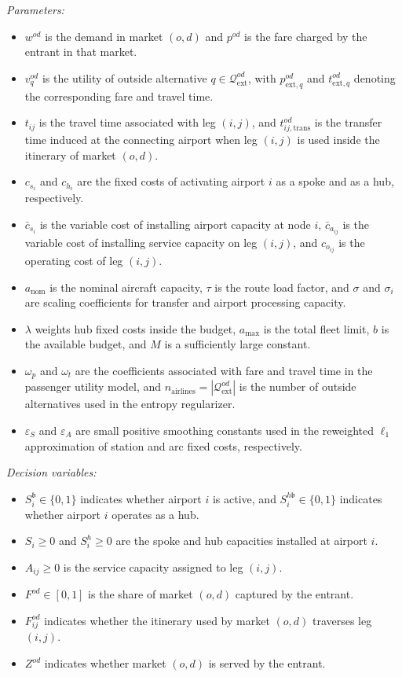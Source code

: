 \bigskip
\noindent \textit{Parameters:}
\begin{itemize}
\item $w^{od}$ is the demand in market $(o,d)$ and $p^{od}$ is the fare charged by the entrant in that market.
\item $v_q^{od}$ is the utility of outside alternative $q\in\mathcal{Q}_{\mathrm{ext}}^{od}$, with $p^{od}_{\mathrm{ext},q}$ and $t^{od}_{\mathrm{ext},q}$ denoting the corresponding fare and travel time.
\item $t_{ij}$ is the travel time associated with leg $(i,j)$, and $t^{od}_{ij,\mathrm{trans}}$ is the transfer time induced at the connecting airport when leg $(i,j)$ is used inside the itinerary of market $(o,d)$.
\item $c_{s_i}$ and $c_{h_i}$ are the fixed costs of activating airport $i$ as a spoke and as a hub, respectively.
\item $\bar c_{s_i}$ is the variable cost of installing airport capacity at node $i$, $\bar c_{a_{ij}}$ is the variable cost of installing service capacity on leg $(i,j)$, and $c_{o_{ij}}$ is the operating cost of leg $(i,j)$.
\item $a_{\mathrm{nom}}$ is the nominal aircraft capacity, $\tau$ is the route load factor, and $\sigma$ and $\sigma_i$ are scaling coefficients for transfer and airport processing capacity.
\item $\lambda$ weights hub fixed costs inside the budget, $a_{\max}$ is the total fleet limit, $b$ is the available budget, and $M$ is a sufficiently large constant.
\item $\omega_p$ and $\omega_t$ are the coefficients associated with fare and travel time in the passenger utility model, and $n_{\mathrm{airlines}}=|\mathcal{Q}_{\mathrm{ext}}^{od}|$ is the number of outside alternatives used in the entropy regularizer.
\item $\varepsilon_S$ and $\varepsilon_A$ are small positive smoothing constants used in the reweighted $\ell_1$ approximation of station and arc fixed costs, respectively.
\end{itemize}

\bigskip
\noindent \textit{Decision variables:}
\begin{itemize}
\item $S_i^{\mathfrak b}\in\{0,1\}$ indicates whether airport $i$ is active, and $S_i^{h\mathfrak b}\in\{0,1\}$ indicates whether airport $i$ operates as a hub.
\item $S_i\ge 0$ and $S_i^h\ge 0$ are the spoke and hub capacities installed at airport $i$.
\item $A_{ij}\ge 0$ is the service capacity assigned to leg $(i,j)$.
\item $F^{od}\in[0,1]$ is the share of market $(o,d)$ captured by the entrant.
\item $F_{ij}^{od}$ indicates whether the itinerary used by market $(o,d)$ traverses leg $(i,j)$.
\item $Z^{od}$ indicates whether market $(o,d)$ is served by the entrant.
\end{itemize}

